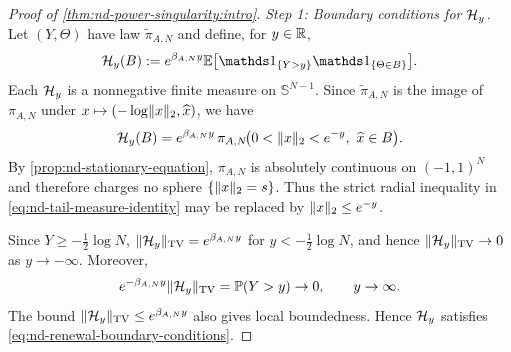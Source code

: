\documentclass[11pt,reqno,a4paper]{article}
\newcommand{\Pp}{\P}
\newcommand{\Ee}{\E}
\begin{document}
\begin{proof}[Proof of \cref{thm:nd-power-singularity:intro}]
  \emph{Step 1: Boundary conditions for $\mathcal H_y$.}
  Let
  $(Y,\Theta)$ have law $\widetilde{\pi}_{A,N}$ and define, for $y\in\mathbb{R}$,
  \begin{equation}\label{eq:nd-weighted-tail-measure}
    \Hcal_y(B)
    :=
    e^{\beta_{A,N}y}
    \Ee\left[
      \one_{\{Y>y\}}\one_{\{\Theta\in B\}}
    \right].
  \end{equation}
  Each $\mathcal H_y$ is a nonnegative finite measure on $\mathbb S^{N-1}$. Since
  $\widetilde{\pi}_{A,N}$ is the image of $\pi_{A,N}$ under
  $x\mapsto(-\log\lVert x\rVert_2,\widehat x)$, we have
  \begin{equation}\label{eq:nd-tail-measure-identity}
    \Hcal_y(B)
    =
    e^{\beta_{A,N}y}\,
    \pi_{A,N}\!\left(0<\norm{x}_2<e^{-y},\ \hat x\in B\right).
  \end{equation}
  By \cref{prop:nd-stationary-equation}, $\pi_{A,N}$ is absolutely continuous on
  $(-1,1)^N$ and therefore charges no sphere $\{\lVert x\rVert_2=s\}$. Thus the strict
  radial inequality in \cref{eq:nd-tail-measure-identity} may be replaced by
  $\lVert x\rVert_2\leq e^{-y}$.

  Since $Y\geq-\frac12\log N$,
  $\lVert\mathcal H_y\rVert_{\mathrm{TV}}=e^{\beta_{A,N}y}$ for
  $y<-\frac12\log N$, and hence
  $\lVert\mathcal H_y\rVert_{\mathrm{TV}}\to0$ as $y\to-\infty$.
  Moreover,
  \begin{equation*}
    e^{-\beta_{A,N}y}\norm{\Hcal_y}_{\mathrm{TV}}
    =
    \Pp(Y>y)
    \to0,
    \qquad y\to\infty.
  \end{equation*}
  The bound $\lVert\mathcal H_y\rVert_{\mathrm{TV}}\leq e^{\beta_{A,N}y}$ also gives local
  boundedness. Hence $\mathcal H_y$ satisfies
  \cref{eq:nd-renewal-boundary-conditions}.


\end{proof}
\end{document}
